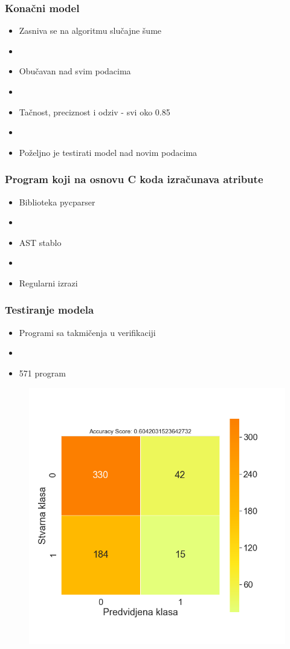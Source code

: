 \documentclass[14pt]{beamer}
\begin{document}
\begin{frame}
\frametitle{Konačni model}

\begin{itemize}
\item Zasniva se na algoritmu slučajne šume
\item[]
\item Obučavan nad svim podacima
\item[]
\item Tačnost, preciznost i odziv - svi oko 0.85
\item[]
\item Poželjno je testirati model nad novim podacima
\end{itemize}

\end{frame}

\begin{frame}
\frametitle{Program koji na osnovu C koda izračunava atribute}

\begin{itemize}
\item Biblioteka pycparser 
\item[]
\item AST stablo
\item[]
\item Regularni izrazi
\end{itemize}

\end{frame}

\begin{frame}
\frametitle{Testiranje modela}


\begin{itemize}
\item Programi sa takmičenja u verifikaciji
\item[]
\item 571 program

\end{itemize}

\begin{figure}
\includegraphics[width=0.5\linewidth]{confm}
\end{figure}


\end{frame}
\end{document}
